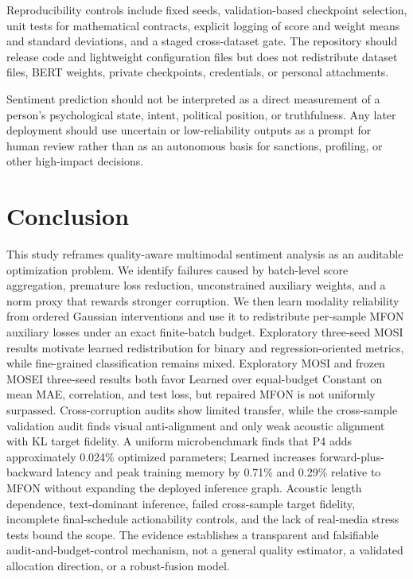 Reproducibility controls include fixed seeds, validation-based
checkpoint selection, unit tests for mathematical contracts, explicit
logging of score and weight means and standard deviations, and a staged
cross-dataset gate. The repository should release code and lightweight
configuration files but does not redistribute dataset files, BERT
weights, private checkpoints, credentials, or personal attachments.

Sentiment prediction should not be interpreted as a direct measurement
of a person's psychological state, intent, political position, or
truthfulness. Any later deployment should use uncertain or
low-reliability outputs as a prompt for human review rather than as an
autonomous basis for sanctions, profiling, or other high-impact
decisions.

\section{Conclusion}\label{conclusion}

This study reframes quality-aware multimodal sentiment analysis as an
auditable optimization problem. We identify failures caused by
batch-level score aggregation, premature loss reduction, unconstrained
auxiliary weights, and a norm proxy that rewards stronger corruption. We
then learn modality reliability from ordered Gaussian interventions and use it to
redistribute per-sample MFON auxiliary losses under an exact
finite-batch budget. Exploratory three-seed MOSI results motivate learned
redistribution for binary and regression-oriented metrics, while fine-grained
classification remains mixed. Exploratory MOSI and frozen MOSEI three-seed
results both favor Learned over equal-budget Constant on mean MAE,
correlation, and test loss, but repaired MFON is not uniformly surpassed.
Cross-corruption audits show limited transfer, while the cross-sample
validation audit finds visual anti-alignment and only weak acoustic alignment
with KL target fidelity. A uniform microbenchmark finds that P4 adds approximately
0.024\% optimized parameters; Learned increases forward-plus-backward latency
and peak training memory by 0.71\% and 0.29\% relative to MFON without
expanding the deployed inference graph. Acoustic length dependence,
text-dominant inference, failed cross-sample target fidelity, incomplete
final-schedule actionability controls, and the lack of real-media stress tests
bound the scope. The evidence establishes a transparent and falsifiable
audit-and-budget-control mechanism, not a general quality estimator, a
validated allocation direction, or a robust-fusion model.
